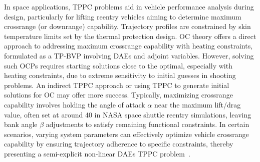 In space applications, \ac{TPPC} problems aid in vehicle performance analysis during design, particularly for lifting reentry vehicles aiming to determine maximum crossrange (or downrange) capability. Trajectory profiles are constrained by skin temperature limits set by the thermal protection design. \ac{OC} theory offers a direct approach to addressing maximum crossrange capability with heating constraints, formulated as a \ac{TP-BVP} involving \acp{DAE} and adjoint variables. However, solving such \acp{OCP} requires starting solutions close to the optimal, especially with heating constraints, due to extreme sensitivity to initial guesses in shooting problems. An indirect \ac{TPPC} approach or using \ac{TPPC} to generate initial solutions for \ac{OC} may offer more success. Typically, maximizing crossrange capability involves holding the angle of attack $\alpha$ near the maximum lift/drag value, often set at around \SI{40}{\deg} in \ac{NASA} space shuttle reentry simulations, leaving bank angle $\beta$ adjustments to satisfy remaining functional constraints. In certain scenarios, varying system parameters can effectively optimize vehicle crossrange capability by ensuring trajectory adherence to specific constraints, thereby presenting a semi-explicit non-linear \acp{DAE} \ac{TPPC} problem~\cite{brenan1986numerical, brenan1995numerical}.

